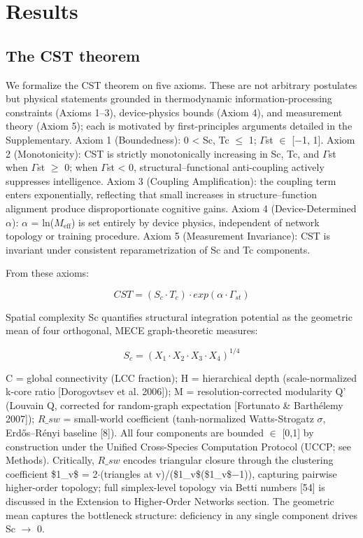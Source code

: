 \documentclass[a4paper,12pt]{article}
\begin{document}
\section{Results}


\subsection{The CST theorem}

We formalize the CST theorem on five axioms. These are not arbitrary postulates but physical statements grounded in thermodynamic information-processing constraints (Axioms 1--3), device-physics bounds (Axiom 4), and measurement theory (Axiom 5); each is motivated by first-principles arguments detailed in the Supplementary. Axiom 1 (Boundedness): 0 < Sc, Tc $\leq$ 1; $\Gamma$st $\in$ [−1, 1]. Axiom 2 (Monotonicity): CST is strictly monotonically increasing in Sc, Tc, and $\Gamma$st when $\Gamma$st $\geq$ 0; when $\Gamma$st < 0, structural--functional anti-coupling actively suppresses intelligence. Axiom 3 (Coupling Amplification): the coupling term enters exponentially, reflecting that small increases in structure--function alignment produce disproportionate cognitive gains. Axiom 4 (Device-Determined $\alpha$): $\alpha$ = ln($M_{\text{eff}}$) is set entirely by device physics, independent of network topology or training procedure. Axiom 5 (Measurement Invariance): CST is invariant under consistent reparametrization of Sc and Tc components.


From these axioms:


\begin{equation}

CST = (S_c \cdot T_c) \cdot exp(\alpha \cdot \Gamma_{st}) \tag{1}

\end{equation}


Spatial complexity Sc quantifies structural integration potential as the geometric mean of four orthogonal, MECE graph-theoretic measures:


\begin{equation}

S_c = (X_1 \cdot X_2 \cdot X_3 \cdot X_4)^{1/4} \tag{2}

\end{equation}


C = global connectivity (LCC fraction); H = hierarchical depth (scale-normalized k-core ratio [Dorogovtsev et al. 2006]); M = resolution-corrected modularity Q' (Louvain Q, corrected for random-graph expectation [Fortunato \& Barthélemy 2007]); $R\_{sw}$ = small-world coefficient (tanh-normalized Watts-Strogatz $\sigma$, Erdős--Rényi baseline [8]). All four components are bounded $\in$ [0,1] by construction under the Unified Cross-Species Computation Protocol (UCCP; see Methods). Critically, $R\_{sw}$ encodes triangular closure through the clustering coefficient \$1_{v}\$ = 2$\cdot$(triangles at v)/(\$1_{v}\$(\$1_{v}\$−1)), capturing pairwise higher-order topology; full simplex-level topology via Betti numbers [54] is discussed in the Extension to Higher-Order Networks section. The geometric mean captures the bottleneck structure: deficiency in any single component drives Sc $\rightarrow$ 0.
\end{document}
